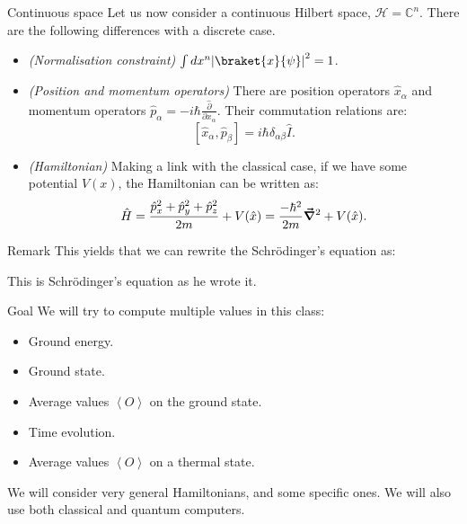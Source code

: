 \documentclass[a4paper]{article}
\begin{document}
\begin{parag}{Continuous space}
    Let us now consider a continuous Hilbert space, $\mathcal{H} = \mathbb{C}^n$. There are the following differences with a discrete case.

    \begin{itemize}[left=0pt]
        \item \textit{(Normalisation constraint)} $\int d x^n \left|\braket{x}{\psi}\right|^2 = 1$.
        \item \textit{(Position and momentum operators)} There are position operators $\hat{x}_{\alpha}$ and momentum operators $\hat{p}_{\alpha} = - i \hbar \frac{\hat{\partial}}{\partial x_{\alpha}}$. Their commutation relations are: 
        \[\left[\hat{x}_{\alpha}, \hat{p}_{\beta}\right] = i \hbar \delta_{\alpha \beta} \hat{I}.\]
        \item \textit{(Hamiltonian)} Making a link with the classical case, if we have some potential $V\left(x\right)$, the Hamiltonian can be written as: 
    \[\hat{H} = \frac{\hat{p}_x^2 + \hat{p}_y^2 + \hat{p}_z^2}{2m} + V\left(\hat{x}\right) = \frac{-\hbar^2}{2m} \bvec{\nabla}^2 + V\left(\hat{x}\right).\]
    \end{itemize}
    
    \begin{subparag}{Remark}
        This yields that we can rewrite the Schrödinger's equation as: 

        This is Schrödinger's equation as he wrote it.
    \end{subparag}
\end{parag}

\begin{parag}{Goal}
    We will try to compute multiple values in this class:
    \begin{itemize}
        \item Ground energy.
        \item Ground state.
        \item Average values $\left\langle O \right\rangle$ on the ground state.
        \item Time evolution.
        \item Average values $\left\langle O \right\rangle$ on a thermal state.
    \end{itemize}

    We will consider very general Hamiltonians, and some specific ones. We will also use both classical and quantum computers.
\end{parag}
\end{document}

